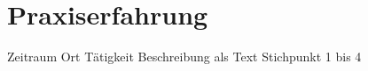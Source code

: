 

\section*{Praxiserfahrung}

\medskip

\experience%
	{Zeitraum}
	{}
	{Ort}
	{Tätigkeit}
	{Beschreibung als Text}
	{Stichpunkt 1 bis 4}
	{}
	{}
	{}

	
